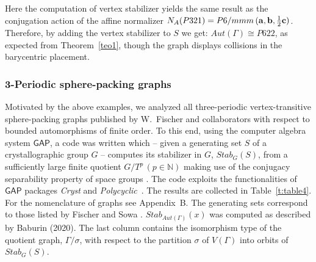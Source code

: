 \documentclass[11pt,a4paper]{article}
\newcommand{\N}{\mathbb N}
\newcommand{\GAP}{\mathsf{GAP}}
\begin{document}
\noindent Here the computation of vertex stabilizer yields the same result as the conjugation action of the affine normalizer $N_A(P321) = P6/mmm \, ({\bf{a}}, {\bf{b}}, \frac{1}{2}{\bf{c}})$. Therefore, by adding the vertex stabilizer to $S$ we get: $Aut(\Gamma) \cong P622$, as expected from Theorem~\ref{teo1}, though the graph displays collisions in the barycentric placement.

\subsubsection{3-Periodic sphere-packing graphs}

Motivated by the above examples, we analyzed all three-periodic vertex-transitive sphere-packing graphs published by W.~Fischer and collaborators with respect to bounded automorphisms of finite order. To this end, using the computer algebra system $\GAP$, a code was written which -- given a generating set $S$ of a crystallographic group $G$ -- computes its stabilizer in $G$, $Stab_G(S)$, from a sufficiently large finite quotient $G/T^p \, (p \in \N)$ making use of the conjugacy separability property of space groups \cite{Dere26}. The code exploits the functionalities of $\GAP$ packages \emph{Cryst} \cite{Cryst2019} and \emph{Polycyclic}~\cite{Polyc2020}. The results are collected in Table~\ref{t:table4}. For the nomenclature of graphs see Appendix~B. The generating sets correspond to those listed by Fischer \cite{Fischer74, Fischer93} and Sowa \cite{Sowa2012}. $Stab_{Aut(\Gamma)}(x)$ was computed as described by Baburin (2020). The last column contains the isomorphism type of the quotient graph, $\Gamma/\sigma$, with respect to the partition $\sigma$ of $V(\Gamma)$ into orbits of $Stab_G(S)$. 
\end{document}
